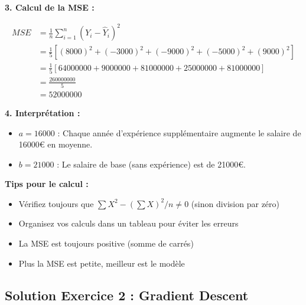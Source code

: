 \documentclass[11pt,a4paper]{article}
\begin{document}
\begin{solutionbox}
\textbf{3. Calcul de la MSE :}

\begin{align*}
MSE &= \frac{1}{n}\sum_{i=1}^{n}(Y_i - \hat{Y}_i)^2 \\
    &= \frac{1}{5}[(8000)^2 + (-3000)^2 + (-9000)^2 + (-5000)^2 + (9000)^2] \\
    &= \frac{1}{5}[64000000 + 9000000 + 81000000 + 25000000 + 81000000] \\
    &= \frac{260000000}{5} \\
    &= 52000000
\end{align*}

\textbf{4. Interprétation :}
\begin{itemize}
    \item \textbf{$a = 16000$} : Chaque année d'expérience supplémentaire augmente le salaire de 16000€ en moyenne.
    \item \textbf{$b = 21000$} : Le salaire de base (sans expérience) est de 21000€.
\end{itemize}
\end{solutionbox}

\begin{tipbox}
\textbf{Tips pour le calcul :}
\begin{itemize}
    \item Vérifiez toujours que $\sum X^2 - (\sum X)^2/n \neq 0$ (sinon division par zéro)
    \item Organisez vos calculs dans un tableau pour éviter les erreurs
    \item La MSE est toujours positive (somme de carrés)
    \item Plus la MSE est petite, meilleur est le modèle
\end{itemize}
\end{tipbox}

\subsection{Solution Exercice 2 : Gradient Descent}
\end{document}

